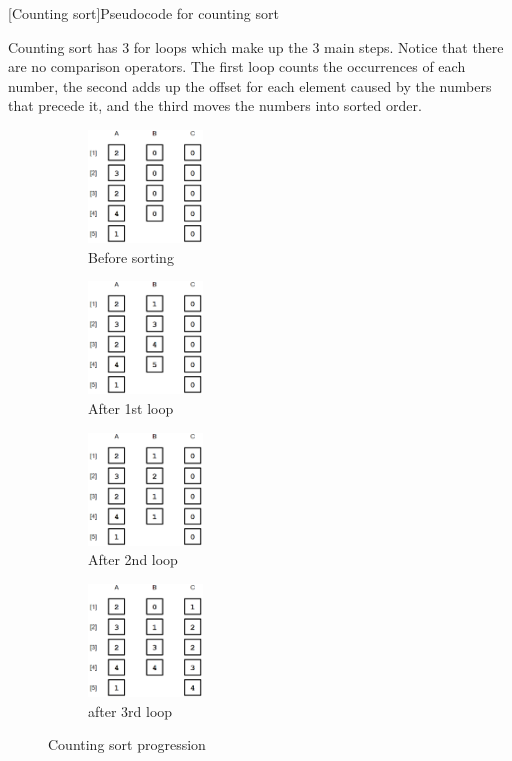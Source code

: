 \documentclass[12pt]{article}
\begin{document}
	
	\begin{center}
		[Counting sort]{Pseudocode for counting sort\cite[p.~195]{intro}}
		
		\label{snip:countsort}
	\end{center}
	
	Counting sort has 3 for loops which make up the 3 main steps. 
	Notice that there are no comparison operators.
	The first loop counts the occurrences of each number, the second adds up the offset for each element caused by the numbers that precede it, and the third moves the numbers into sorted order.
	\begin{figure}[H]
		
		\begin{subfigure}{0.24\textwidth}
			\includegraphics[width=1.2in]{_0000_count0.png} 
			\caption{Before sorting}
			\label{fig:count1}
		\end{subfigure}
		\begin{subfigure}{0.24\textwidth}
			\includegraphics[width=1.2in]{_0001_count1.png}
			\caption{After 1st loop}
			\label{fig:count2}
		\end{subfigure}
		\begin{subfigure}{0.24\textwidth}
			\includegraphics[width=1.2in]{_0002_count2.png}
			\caption{After 2nd loop}
			\label{fig:count3}
		\end{subfigure}
		\begin{subfigure}{0.24\textwidth}
			\includegraphics[width=1.2in]{_0003_count3.png}
			\caption{after 3rd loop}
			\label{fig:count4}
		\end{subfigure}

		\caption{Counting sort progression}
		\label{fig:countmerge}
	\end{figure}
	
\end{document}
